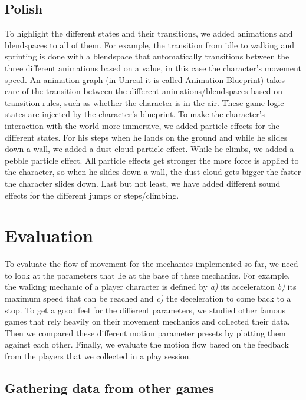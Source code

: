 \documentclass[conference]{IEEEtran}
\begin{document}
\subsection{Polish}

To highlight the different states and their transitions, we added animations and blendspaces to all of them.
For example, the transition from idle to walking and sprinting is done with a blendspace that automatically transitions between the three different animations based on a value, in this case the character's movement speed.
An animation graph (in Unreal it is called Animation Blueprint) takes care of the transition between the different animations/blendspaces based on transition rules, such as whether the character is in the air.
These game logic states are injected by the character's blueprint.
To make the character's interaction with the world more immersive, we added particle effects for the different states.
For his steps when he lands on the ground and while he slides down a wall, we added a dust cloud particle effect.
While he climbs, we added a pebble particle effect.
All particle effects get stronger the more force is applied to the character, so when he slides down a wall, the dust cloud gets bigger the faster the character slides down.
Last but not least, we have added different sound effects for the different jumps or steps/climbing.

\section{Evaluation}
\label{Sec:Evaluation}

To evaluate the flow of movement for the mechanics implemented so far, we need to look at the parameters that lie at the base of these mechanics.
For example, the walking mechanic of a player character is defined by \textit{a)} its acceleration \textit{b)} its maximum speed that can be reached and \textit{c)} the deceleration to come back to a stop.
To get a good feel for the different parameters, we studied other famous games that rely heavily on their movement mechanics and collected their data.
Then we compared these different motion parameter presets by plotting them against each other.
Finally, we evaluate the motion flow based on the feedback from the players that we collected in a play session.

\subsection{Gathering data from other games}
\end{document}

